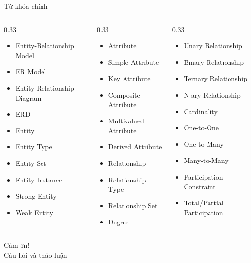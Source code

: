 \documentclass[aspectratio=169,11pt]{beamer}
\newcommand{\smallitem}{\setlength{\itemsep}{2pt}\setlength{\parskip}{0pt}}
\begin{document}
\begin{frame}{Từ khóa chính}
\scriptsize
\begin{columns}[T]
\begin{column}{0.33\textwidth}
\begin{itemize}
\smallitem
  \item Entity-Relationship Model
  \item ER Model
  \item Entity-Relationship Diagram
  \item ERD
  \item Entity
  \item Entity Type
  \item Entity Set
  \item Entity Instance
  \item Strong Entity
  \item Weak Entity
\end{itemize}
\end{column}
\begin{column}{0.33\textwidth}
\begin{itemize}
\smallitem
  \item Attribute
  \item Simple Attribute
  \item Key Attribute
  \item Composite Attribute
  \item Multivalued Attribute
  \item Derived Attribute
  \item Relationship
  \item Relationship Type
  \item Relationship Set
  \item Degree
\end{itemize}
\end{column}
\begin{column}{0.33\textwidth}
\begin{itemize}
\smallitem
  \item Unary Relationship
  \item Binary Relationship
  \item Ternary Relationship
  \item N-ary Relationship
  \item Cardinality
  \item One-to-One
  \item One-to-Many
  \item Many-to-Many
  \item Participation Constraint
  \item Total/Partial Participation
\end{itemize}
\end{column}
\end{columns}
\end{frame}

\begin{frame}
\centering
\Huge Cảm ơn!\\[0.5cm]
\Large Câu hỏi và thảo luận
\end{frame}
\end{document}

